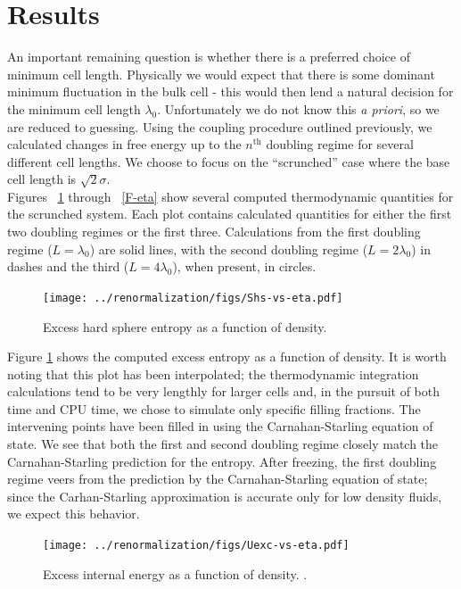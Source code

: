 \documentclass[12pt]{article}
\newcommand{\ignore}[1]{}
\begin{document}
\section{Results}
An important remaining question is whether there is a preferred choice of minimum cell length. Physically we would expect that there is some dominant minimum fluctuation in the bulk cell - this would then lend a natural decision for the minimum cell length $\lambda_0$. Unfortunately we do not know this {\it a priori}, so we are reduced to guessing. Using the coupling procedure outlined previously, we calculated changes in free energy up to the $n^{\text{th}}$ doubling regime for several different cell lengths. We choose to focus on the ``scrunched'' case where the base cell length is $\sqrt2\sigma$.\\

Figures ~\ref{Shs-eta} through ~\ref{F-eta} show several computed thermodynamic quantities for the scrunched system. Each plot contains calculated quantities for either the first two doubling regimes or the first three. Calculations from the first doubling regime ($L=\lambda_0$) are solid lines, with the second doubling regime ($L = 2\lambda_0$) in dashes and the third ($L = 4\lambda_0$), when present, in circles. 


\begin{figure}
\centering
    \texttt{[image: ../renormalization/figs/Shs-vs-eta.pdf]}
    \caption{Excess hard sphere entropy as a function of density.}
    \label{Shs-eta}
\end{figure}
\ignore{Filling fraction or density? Value in distinction? We never use number density for the sake of units...}
Figure \ref{Shs-eta} shows the computed excess entropy as a function of density. It is worth noting that this plot has been interpolated; the thermodynamic integration calculations tend to be very lengthly for larger cells and, in the pursuit of both time and CPU time, we chose to simulate only specific filling fractions. The intervening points have been filled in using the Carnahan-Starling equation of state. We see that both the first and second doubling regime closely match the Carnahan-Starling prediction for the entropy. After freezing, the first doubling regime veers from the prediction by the Carnahan-Starling equation of state; since the Carhan-Starling approximation is accurate only for low density fluids, we expect this behavior.\\
\begin{figure}
    \centering
    \texttt{[image: ../renormalization/figs/Uexc-vs-eta.pdf]}
    \caption{Excess internal energy as a function of density. .}
    \label{U-eta}
\end{figure}
\end{document}
